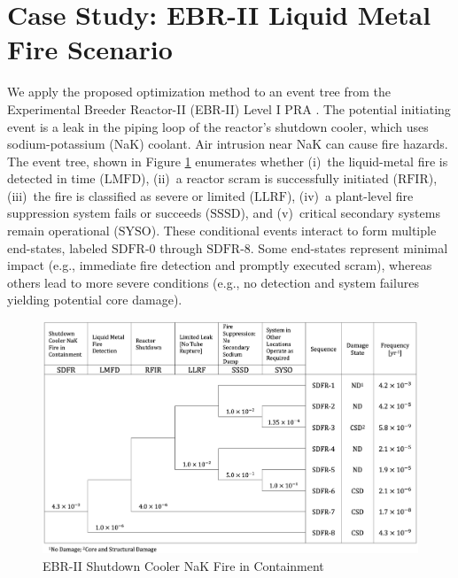 \section{Case Study: EBR-II Liquid Metal Fire Scenario}
\label{sec:case_study_ebr2}
We apply the proposed optimization method to an event tree from the Experimental Breeder Reactor-II (EBR-II) Level I PRA \citep{chang_experimental_2018}. The potential initiating event is a leak in the piping loop of the reactor's shutdown cooler, which uses sodium-potassium (NaK) coolant. Air intrusion near NaK can cause fire hazards. The event tree, shown in Figure \ref{fig:ebr2_sdfr_et} enumerates whether (i)~the liquid-metal fire is detected in time (\(\text{LMFD}\)), (ii)~a reactor scram is successfully initiated (\(\text{RFIR}\)), (iii)~the fire is classified as severe or limited (\(\text{LLRF}\)), (iv)~a plant-level fire suppression system fails or succeeds (\(\text{SSSD}\)), and (v)~critical secondary systems remain operational (\(\text{SYSO}\)). These conditional events interact to form multiple end-states, labeled \(\text{SDFR-0}\) through \(\text{SDFR-8}\). Some end-states represent minimal impact (e.g., immediate fire detection and promptly executed scram), whereas others lead to more severe conditions (e.g., no detection and system failures yielding potential core damage).

\begin{figure}[h]
  \centering
\includegraphics[width=1.0\textwidth]{parts/4_learning/1_param/figs/event_tree_NaK_fire.png} 
    \caption{EBR-II Shutdown Cooler NaK Fire in Containment}
    \label{fig:ebr2_sdfr_et}
\end{figure}

